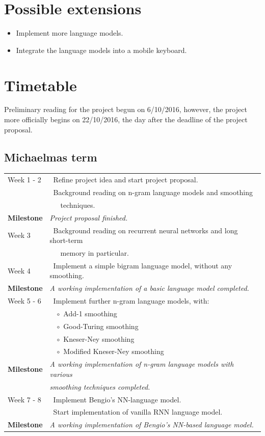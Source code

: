 \documentclass[a4paper, 12pt]{article}
\newcommand{\tbf}[1]{\textbf{#1}}
\newcommand{\tit}[1]{\textit{#1}}
\newcommand{\bpt}[0]{\textbullet~}
\newcommand{\wbpt}[0]{$\circ$~}
\begin{document}
\section*{Possible extensions}

\begin{itemize}
\item
	Implement more language models.
\item
	Integrate the language models into a mobile keyboard.
\end{itemize}

\section*{Timetable}

Preliminary reading for the project begun on 6/10/2016, however, the project more officially begins on 22/10/2016, the day after the deadline of the project proposal.

\subsection*{Michaelmas term}
\begin{tabular}{l | l}
	Week 1 - 2 & \bpt Refine project idea and start project proposal. \\
	& \bpt Background reading on n-gram language models and smoothing \\
	&~~~techniques. \\
	\tbf{Milestone} & \tit{Project proposal finished.} \\ \hline
	Week 3 & \bpt Background reading on recurrent neural networks and long short-term \\
	&~~~memory in particular. \\
	Week 4 & \bpt Implement a simple bigram language model, without any smoothing. \\
	\tbf{Milestone} & \tit{A working implementation of a basic language model completed.} \\ \hline
	Week 5 - 6 & \bpt Implement further n-gram language models, with: \\
	&~~\wbpt Add-1 smoothing \\
	&~~\wbpt Good-Turing smoothing \\
	&~~\wbpt Kneser-Ney smoothing \\
	&~~\wbpt Modified Kneser-Ney smoothing \\
	\tbf{Milestone} & \tit{A working implementation of n-gram language models with various} \\
	& \tit{smoothing techniques completed.} \\ \hline
	Week 7 - 8 & \bpt Implement Bengio's NN-language model. \\
	& \bpt Start implementation of vanilla RNN language model. \\
	\tbf{Milestone} & \tit{A working implementation of Bengio's NN-based language model.} \\
\end{tabular}
\end{document}
